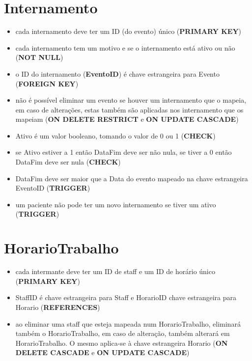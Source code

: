 \documentclass[article, a4paper, 12pt, oneside]{memoir}
\begin{document}
\newpage

\section*{Internamento}
\begin{itemize}
	\item cada internamento deve ter um ID (do evento) único (\textbf{PRIMARY KEY})
	\item cada internamento tem um motivo e se o internamento está ativo ou não (\textbf{NOT NULL})
	\item o ID do internamento (\textbf{EventoID}) é chave estrangeira para Evento (\textbf{FOREIGN KEY})
	\item não é possível eliminar um evento se houver um internamento que o mapeia, em caso de alterações, estas também são aplicadas nos internamento que os mapeiam (\textbf{ON DELETE RESTRICT} e \textbf{ON UPDATE CASCADE})
	\item Ativo é um valor booleano, tomando o valor de 0 ou 1 (\textbf{CHECK})
	\item se Ativo estiver a 1 então DataFim deve ser não nula, se tiver a 0 então DataFim deve ser nula (\textbf{CHECK})
	\item DataFim deve ser maior que a Data do evento mapeado na chave estrangeira EventoID (\textbf{TRIGGER})
	\item um paciente não pode ter um novo internamento se tiver um ativo (\textbf{TRIGGER})
\end{itemize}

\section*{HorarioTrabalho}
\begin{itemize}
	\item cada intermante deve ter um ID de staff e um ID de horário único (\textbf{PRIMARY KEY})
	\item StaffID é chave estrangeira para Staff e HorarioID chave estrangeira para Horario (\textbf{REFERENCES})
	\item ao eliminar uma staff que esteja mapeada num HorarioTrabalho, eliminará também o HorarioTrabalho, em caso de alteração, também alterará em HorarioTrabalho. O mesmo aplica-se à chave estrangeira Horario (\textbf{ON DELETE CASCADE} e \textbf{ON UPDATE CASCADE})
\end{itemize}
\end{document}
